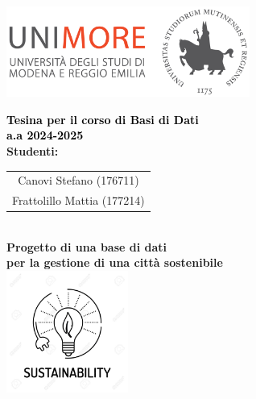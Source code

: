 \begin{titlepage}
\begin{center}
    \includegraphics[width=0.6\textwidth]{images/Logo_C_Positivo_Colore.png}

    \vspace*{2cm}  %

    {\Huge \textbf{\textcolor{black}{Tesina per il corso di Basi di Dati \\ a.a 2024-2025 }}}\\[1.5cm]
    {\Large \textbf{\textcolor{tudelftdarkblue}{Studenti:}}}\\[0.5cm]
    \begin{tabular}{c}
        \Large \textcolor{tudelftdarkblue}{Canovi Stefano (176711)} \\ 
        \Large \textcolor{tudelftdarkblue}{Frattolillo Mattia (177214)} \\ 
    \end{tabular}\\[2cm]
    
    \vspace*{1cm}
    {\Large \textbf{\textcolor{tudelftdarkblue}{Progetto di una base di dati\\ per la gestione di una città sostenibile }}}\\[1.3cm]
    \includegraphics[width=0.3\textwidth]{images/SOSTENIBILITA.png}

    \end{center}  %
\end{titlepage}
